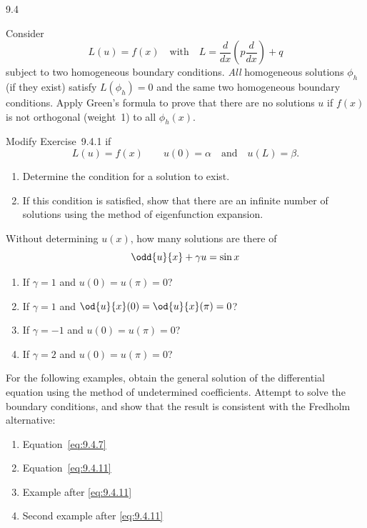 \begin{exercises}{9.4}

\item Consider
\[
L(u) = f(x) \quad\text{with}\quad L = \frac{d}{d x}\!\left(p\frac{d}{d x}\right) + q
\]
subject to two homogeneous boundary conditions.  \emph{All} homogeneous solutions $\phi_h$ (if they exist) satisfy $L(\phi_h) = 0$ and the same two homogeneous boundary conditions.  Apply Green's formula to prove that there are no solutions $u$ if $f(x)$ is not orthogonal (weight~1) to all $\phi_h(x)$.

\item Modify Exercise~9.4.1 if
\[
L(u) = f(x) \qquad u(0) = \alpha \quad\text{and}\quad u(L) = \beta.
\]
\begin{enumerate}
\item[\starred(a)] Determine the condition for a solution to exist.
\item[(b)] If this condition is satisfied, show that there are an infinite number of solutions using the method of eigenfunction expansion.
\end{enumerate}

\item Without determining $u(x)$, how many solutions are there of
\[
\odd{u}{x} + \gamma u = \sin x
\]
\begin{enumerate}
\item[(a)] If $\gamma = 1$ and $u(0) = u(\pi) = 0$?
\item[\starred(b)] If $\gamma = 1$ and $\od{u}{x}(0) = \od{u}{x}(\pi) = 0$?
\item[(c)] If $\gamma = -1$ and $u(0) = u(\pi) = 0$?
\item[(d)] If $\gamma = 2$ and $u(0) = u(\pi) = 0$?
\end{enumerate}

\item For the following examples, obtain the general solution of the differential equation using the method of undetermined coefficients.  Attempt to solve the boundary conditions, and show that the result is consistent with the Fredholm alternative:
\begin{enumerate}
\item[(a)] Equation~\eqref{eq:9.4.7}
\item[(b)] Equation~\eqref{eq:9.4.11}
\item[(c)] Example after \eqref{eq:9.4.11}
\item[(d)] Second example after \eqref{eq:9.4.11}
\end{enumerate}


\end{exercises}
